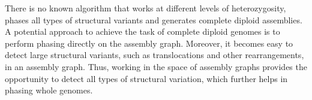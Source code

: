 % 


There is no known algorithm that works at different levels of heterozygosity, phases all types of structural variants and generates complete diploid assemblies.
A potential approach to achieve the task of complete diploid genomes is to perform phasing directly on the assembly graph.
Moreover, it becomes easy to detect large structural variants, such as translocations and other rearrangements, in an assembly graph.
Thus, working in the space of assembly graphs provides the opportunity to detect all types of structural variation, which further helps in phasing whole genomes.

